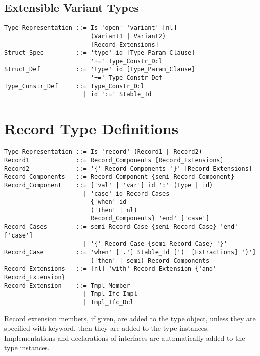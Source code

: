 \subsection{Extensible Variant Types}
\label{sec:extensible-variant-types}

\syntax\begin{lstlisting}
Type_Representation ::= Is 'open' 'variant' [nl]
                        (Variant1 | Variant2)
                        [Record_Extensions]
Struct_Spec         ::= 'type' id [Type_Param_Clause] 
                        '+=' Type_Constr_Dcl
Struct_Def          ::= 'type' id [Type_Param_Clause] 
                        '+=' Type_Constr_Def
Type_Constr_Def     ::= Type_Constr_Dcl 
                      | id ':=' Stable_Id
\end{lstlisting}






\section{Record Type Definitions}
\label{sec:record-types}

\syntax\begin{lstlisting}
Type_Representation ::= Is 'record' (Record1 | Record2)
Record1             ::= Record_Components [Record_Extensions]
Record2             ::= '{' Record_Components '}' [Record_Extensions]
Record_Components   ::= Record_Component {semi Record_Component}
Record_Component    ::= ['val' | 'var'] id ':' (Type | id)
                      | 'case' id Record_Cases
                        {'when' id 
                        ('then' | nl) 
                        Record_Components} 'end' ['case']
Record_Cases        ::= semi Record_Case {semi Record_Case} 'end' ['case']
                      | '{' Record_Case {semi Record_Case} '}'
Record_Case         ::= 'when' ['.'] Stable_Id ['(' [Extractions] ')']
                        ('then' | semi) Record_Components
Record_Extensions   ::= [nl] 'with' Record_Extension {'and' Record_Extension}
Record_Extension    ::= Tmpl_Member
                      | Tmpl_Ifc_Impl
                      | Tmpl_Ifc_Dcl
\end{lstlisting}

Record extension members, if given, are added to the type object, unless they are specified with  keyword, then they are added to the type instances. Implementations and declarations of interfaces are automatically added to the type instances. 





